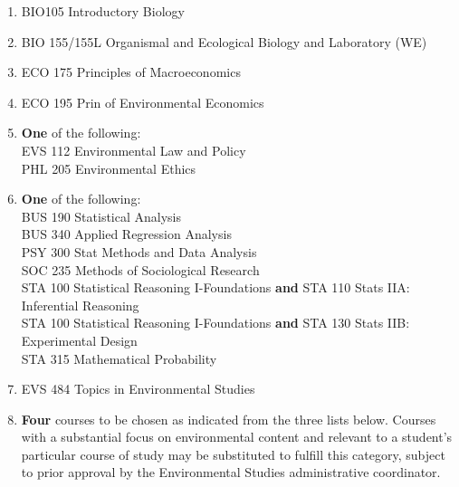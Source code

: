\documentclass[
  letterpaper,
]{scrbook}
\providecommand{\tightlist}{%
  \setlength{\itemsep}{0pt}\setlength{\parskip}{0pt}}
\begin{document}
\begin{enumerate}
\def\labelenumi{\arabic{enumi}.}
\tightlist
\item
  BIO105 Introductory Biology
\item
  BIO 155/155L Organismal and Ecological Biology and Laboratory (WE)
\item
  ECO 175 Principles of Macroeconomics
\item
  ECO 195 Prin of Environmental Economics
\item
  \textbf{One} of the following:\\
  EVS 112 Environmental Law and Policy\\
  PHL 205 Environmental Ethics\\
\item
  \textbf{One} of the following:\\
  BUS 190 Statistical Analysis\\
  BUS 340 Applied Regression Analysis\\
  PSY 300 Stat Methods and Data Analysis\\
  SOC 235 Methods of Sociological Research\\
  STA 100 Statistical Reasoning I-Foundations \textbf{and} STA 110 Stats
  IIA: Inferential Reasoning\\
  STA 100 Statistical Reasoning I-Foundations \textbf{and} STA 130 Stats
  IIB: Experimental Design\\
  STA 315 Mathematical Probability\\
\item
  EVS 484 Topics in Environmental Studies
\item
  \textbf{Four} courses to be chosen as indicated from the three lists
  below. Courses with a substantial focus on environmental content and
  relevant to a student's particular course of study may be substituted
  to fulfill this category, subject to prior approval by the
  Environmental Studies administrative coordinator.


\end{enumerate}
\end{document}
